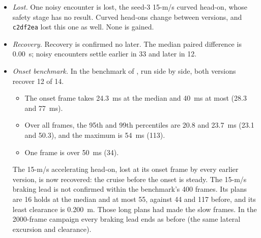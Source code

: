 \documentclass[11pt]{article}
\begin{document}
\begin{itemize}
\item \emph{Lost.} One noisy encounter is lost, the seed-3 15-m/s curved
  head-on, whose safety stage has no result. Curved head-ons change between
  versions, and \texttt{c2df2ea} lost this one as well. None is gained.
\item \emph{Recovery.} Recovery is confirmed no later. The median paired
  difference is 0.00~s; noisy encounters settle earlier in 33 and later in
  12.
\item \emph{Onset benchmark.} In the benchmark of
  , run side by side, both
  versions recover 12 of 14.
  \begin{itemize}
  \item The onset frame takes 24.3~ms at the median and 40~ms at most
    (28.3 and 77~ms).
  \item Over all frames, the 95th and 99th percentiles are 20.8 and
    23.7~ms (23.1 and 50.3), and the maximum is 54~ms (113).
  \item One frame is over 50~ms (34).
  \end{itemize}
  The 15-m/s accelerating head-on, lost at its onset frame by every earlier
  version, is now recovered: the cruise before the onset is steady. The
  15-m/s braking lead is not confirmed within the benchmark's 400 frames.
  Its plans are 16 holds at the median and at most 55, against 44 and 117
  before, and its least clearance is 0.200~m. Those long plans had made the
  slow frames. In the 2000-frame campaign every braking lead ends as before
  (the same lateral excursion and clearance).
\end{itemize}
\end{document}
